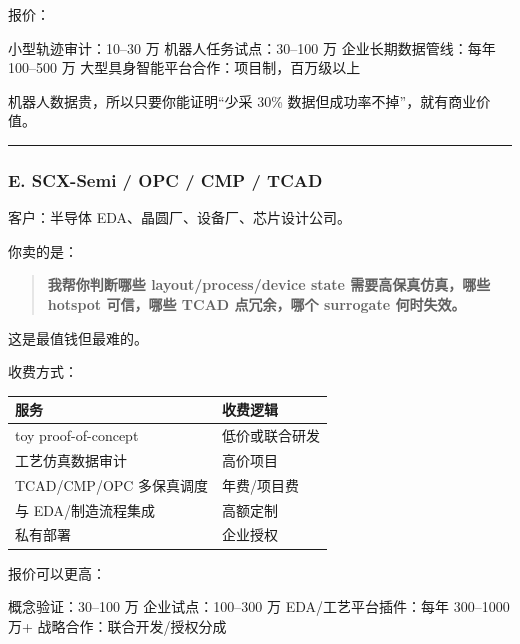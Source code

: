 \documentclass[
  12pt,
]{ctexart}
\newenvironment{Shaded}{}{}
\newcommand{\NormalTok}[1]{#1}
\begin{document}
报价：

\begin{Shaded}
\begin{Highlighting}[]
\NormalTok{小型轨迹审计：10–30 万}
\NormalTok{机器人任务试点：30–100 万}
\NormalTok{企业长期数据管线：每年 100–500 万}
\NormalTok{大型具身智能平台合作：项目制，百万级以上}
\end{Highlighting}
\end{Shaded}

机器人数据贵，所以只要你能证明``少采 30\%
数据但成功率不掉''，就有商业价值。

\begin{center}\rule{0.5\linewidth}{0.5pt}\end{center}

\subsubsection{E. SCX-Semi / OPC / CMP /
TCAD}\label{e.-scx-semi-opc-cmp-tcad}

客户：半导体 EDA、晶圆厂、设备厂、芯片设计公司。

你卖的是：

\begin{quote}
\textbf{我帮你判断哪些 layout/process/device state 需要高保真仿真，哪些
hotspot 可信，哪些 TCAD 点冗余，哪个 surrogate 何时失效。}
\end{quote}

这是最值钱但最难的。

收费方式：

\begin{longtable}[]{@{}ll@{}}
\toprule\noalign{}
服务 & 收费逻辑 \\
\midrule\noalign{}
\endhead
\bottomrule\noalign{}
\endlastfoot
toy proof-of-concept & 低价或联合研发 \\
工艺仿真数据审计 & 高价项目 \\
TCAD/CMP/OPC 多保真调度 & 年费/项目费 \\
与 EDA/制造流程集成 & 高额定制 \\
私有部署 & 企业授权 \\
\end{longtable}

报价可以更高：

\begin{Shaded}
\begin{Highlighting}[]
\NormalTok{概念验证：30–100 万}
\NormalTok{企业试点：100–300 万}
\NormalTok{EDA/工艺平台插件：每年 300–1000 万+}
\NormalTok{战略合作：联合开发/授权分成}
\end{Highlighting}
\end{Shaded}
\end{document}
